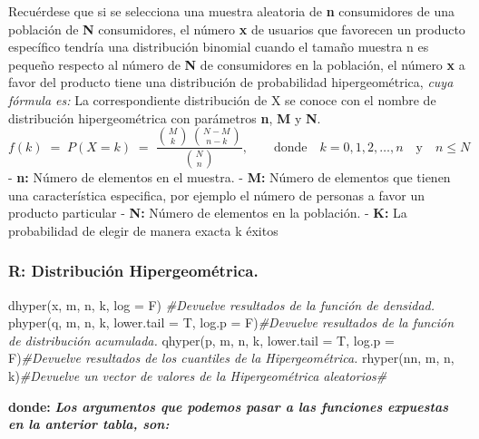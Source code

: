 \documentclass[
]{article}
\newenvironment{Shaded}{\begin{snugshade}}{\end{snugshade}}
\newcommand{\AttributeTok}[1]{\textcolor[rgb]{0.77,0.63,0.00}{#1}}
\newcommand{\CommentTok}[1]{\textcolor[rgb]{0.56,0.35,0.01}{\textit{#1}}}
\newcommand{\FunctionTok}[1]{\textcolor[rgb]{0.00,0.00,0.00}{#1}}
\newcommand{\NormalTok}[1]{#1}
\begin{document}
Recuérdese que si se selecciona una muestra aleatoria de \textbf{n}
consumidores de una población de \textbf{N} consumidores, el número
\textbf{x} de usuarios que favorecen un producto específico tendría una
distribución binomial cuando el tamaño muestra n es pequeño respecto al
número de \textbf{N} de consumidores en la población, el número
\textbf{x} a favor del producto tiene una distribución de probabilidad
hipergeométrica, \emph{cuya fórmula es:} \pagebreak La correspondiente
distribución de X se conoce con el nombre de distribución
hipergeométrica con parámetros \textbf{n}, \textbf{M} y \textbf{N}.
\[ f(k) \;=\; P(X=k)\;= \;  \frac{{M\choose k}\,{N-M\choose n-k}}{{N\choose n}}, \qquad  \text{donde}\quad k=0,1,2, \ldots, n \quad \text{y}\quad n\leq N \]
- \textbf{n:} Número de elementos en el muestra. - \textbf{M:} Número de
elementos que tienen una característica especifica, por ejemplo el
número de personas a favor un producto particular - \textbf{N:} Número
de elementos en la población. - \textbf{K:} La probabilidad de elegir de
manera exacta k éxitos

\hypertarget{r-distribuciuxf3n-hipergeomuxe9trica.}{%
\subsubsection{R: Distribución
Hipergeométrica.}\label{r-distribuciuxf3n-hipergeomuxe9trica.}}

\begin{Shaded}
\begin{Highlighting}[]
\FunctionTok{dhyper}\NormalTok{(x, m, n, k, }\AttributeTok{log =}\NormalTok{ F) }\CommentTok{\#Devuelve resultados de la función de densidad.}
\FunctionTok{phyper}\NormalTok{(q, m, n, k, }\AttributeTok{lower.tail =}\NormalTok{ T, }\AttributeTok{log.p =}\NormalTok{ F)}\CommentTok{\#Devuelve resultados de la función de distribución acumulada.}
\FunctionTok{qhyper}\NormalTok{(p, m, n, k, }\AttributeTok{lower.tail =}\NormalTok{ T, }\AttributeTok{log.p =}\NormalTok{ F)}\CommentTok{\#Devuelve resultados de los cuantiles de la Hipergeométrica.}
\FunctionTok{rhyper}\NormalTok{(nn, m, n, k)}\CommentTok{\#Devuelve un vector de valores de la Hipergeométrica aleatorios\#}
\end{Highlighting}
\end{Shaded}

\textbf{donde:} \textbf{\emph{Los argumentos que podemos pasar a las
funciones expuestas en la anterior tabla, son:}}
\end{document}
